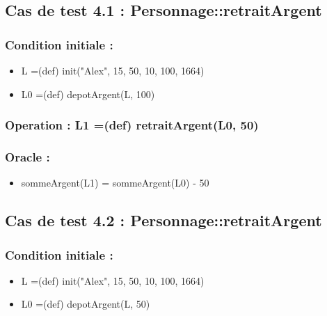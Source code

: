 \documentclass[11pt]{article}
\begin{document}
\subsection{Cas de test 4.1 : Personnage::retraitArgent}
\label{sec-1.9}

\subsubsection{Condition initiale :}
\label{sec-1.9.1}

\begin{itemize}

\item L =(def) init("Alex", 15, 50, 10, 100, 1664)\\
\label{sec-1.9.1.1}


\item L0 =(def) depotArgent(L, 100)\\
\label{sec-1.9.1.2}

\end{itemize} %
\subsubsection{Operation : L1 =(def) retraitArgent(L0, 50)}
\label{sec-1.9.2}

\subsubsection{Oracle :}
\label{sec-1.9.3}

\begin{itemize}

\item sommeArgent(L1) = sommeArgent(L0) - 50\\
\label{sec-1.9.3.1}


\end{itemize} %
\subsection{Cas de test 4.2 : Personnage::retraitArgent}
\label{sec-1.10}

\subsubsection{Condition initiale :}
\label{sec-1.10.1}

\begin{itemize}

\item L =(def) init("Alex", 15, 50, 10, 100, 1664)\\
\label{sec-1.10.1.1}


\item L0 =(def) depotArgent(L, 50)\\
\label{sec-1.10.1.2}

\end{itemize} %
\end{document}
